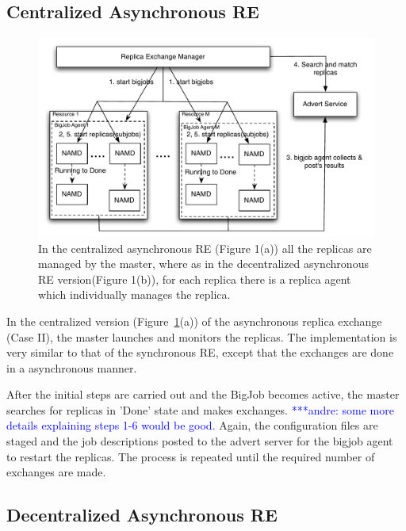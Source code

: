 \documentclass[a4paper,10pt]{article}
\newcommand{\alnote}[1]{ {\textcolor{blue} { ***andre: #1 }}}
\newcommand{\alnote}[1]{}
\begin{document}
\subsection{Centralized Asynchronous RE}

\begin{figure}
\centering
\includegraphics[width=1\textwidth]{figures/centralized.pdf}
\caption{\small In the centralized asynchronous RE (Figure 1(a)) all the replicas are managed by the master, where as in the decentralized asynchronous RE version(Figure 1(b)), for each replica there is a replica agent which individually manages the replica.}
\label{fig:cent}
\end{figure}

In the centralized version (Figure~\ref{fig:cent}(a)) of the asynchronous replica exchange (Case II), the master launches and monitors the replicas. The implementation is very similar to that of the synchronous RE, except that the exchanges are done in a asynchronous manner. 

After the initial steps are carried out and the BigJob becomes active, the master searches for replicas in 'Done' state and makes exchanges. \alnote{some more details explaining steps 1-6 would be good.} Again, the configuration files are staged and the job descriptions posted to the advert server for the bigjob agent to restart the replicas.%
The process is repeated until the required number of exchanges are made.

\subsection{Decentralized Asynchronous RE}
\end{document}
